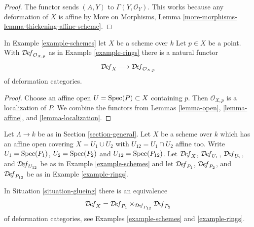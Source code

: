 \begin{proof}
The functor sends $(A, Y)$ to $\Gamma(Y, \mathcal{O}_Y)$.
This works because
any deformation of $X$ is affine by
More on Morphisms, Lemma \ref{more-morphisms-lemma-thickening-affine-scheme}.
\end{proof}

\begin{lemma}
\label{lemma-local-ring}
In Example \ref{example-schemes} let $X$ be a scheme over $k$
Let $p \in X$ be a point. With $\mathcal{D}\!\mathit{ef}_{\mathcal{O}_{X, p}}$
as in Example \ref{example-rings} there is a natural functor
$$
\mathcal{D}\!\mathit{ef}_X
\longrightarrow
\mathcal{D}\!\mathit{ef}_{\mathcal{O}_{X, p}}
$$
of deformation categories.
\end{lemma}

\begin{proof}
Choose an affine open $U = \mathop{\mathrm{Spec}}(P) \subset X$ containing $p$.
Then $\mathcal{O}_{X, p}$ is a localization of $P$. We combine
the functors from
Lemmas \ref{lemma-open}, \ref{lemma-affine}, and \ref{lemma-localization}.
\end{proof}

\begin{situation}
\label{situation-glueing}
Let $\Lambda \to k$ be as in Section \ref{section-general}.
Let $X$ be a scheme over $k$ which has an affine open covering
$X = U_1 \cup U_2$ with $U_{12} = U_1 \cap U_2$ affine too.
Write $U_1 = \mathop{\mathrm{Spec}}(P_1)$, $U_2 = \mathop{\mathrm{Spec}}(P_2)$ and $U_{12} = \mathop{\mathrm{Spec}}(P_{12})$.
Let $\mathcal{D}\!\mathit{ef}_X$, $\mathcal{D}\!\mathit{ef}_{U_1}$,
$\mathcal{D}\!\mathit{ef}_{U_2}$, and $\mathcal{D}\!\mathit{ef}_{U_{12}}$
be as in Example \ref{example-schemes} and let
$\mathcal{D}\!\mathit{ef}_{P_1}$, $\mathcal{D}\!\mathit{ef}_{P_2}$, and
$\mathcal{D}\!\mathit{ef}_{P_{12}}$ be as in Example \ref{example-rings}.
\end{situation}

\begin{lemma}
\label{lemma-glueing}
In Situation \ref{situation-glueing}
there is an equivalence
$$
\mathcal{D}\!\mathit{ef}_X =
\mathcal{D}\!\mathit{ef}_{P_1}
\times_{\mathcal{D}\!\mathit{ef}_{P_{12}}}
\mathcal{D}\!\mathit{ef}_{P_2}
$$
of deformation categories, see Examples \ref{example-schemes} and
\ref{example-rings}.
\end{lemma}

